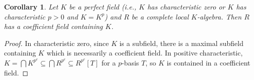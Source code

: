 \documentclass{amsart}[12pt]
\newcommand{\fm}{{\mathfrak m}}
\newcommand{\fa}{{\mathfrak a}}
\newcommand{\fn}{{\mathfrak n}}
\numberwithin{equation}{section}
\theoremstyle{plain} %
\newtheorem{thm}[equation]{Theorem}
\newtheorem{cor}[equation]{Corollary}
\theoremstyle{definition}
\theoremstyle{remark}
\begin{document}
\begin{cor} Let $K$ be a perfect field (i.e., $K$ has characteristic zero or $K$ has characteristic $p>0$ and $K=K^p$) and $R$ be a complete local $K$-algebra. Then $R$ has a coefficient field containing $K$.
\end{cor}
\begin{proof} In characteristic zero, since $K$ is a subfield, there is a maximal subfield containing $K$ which is necessarily a coefficient field. In positive characteristic, $K = \bigcap K^{p^e} \subseteq \bigcap R^{p^e} \subseteq R^{p^e}[T]$ for a $p$-basis $T$, so $K$ is contained in a coefficient field.
\end{proof}

\end{document}
